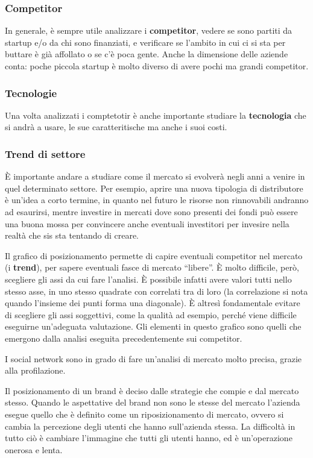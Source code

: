 \subsubsection{Competitor}
In generale, è sempre utile analizzare i \textbf{competitor}, vedere se sono
partiti da startup e/o da chi sono finanziati, e verificare se l'ambito in cui
ci si sta per buttare è già affollato o se c'è poca gente. Anche la dimensione
delle aziende conta: poche piccola startup è molto diverso di avere pochi ma
grandi competitor.

\subsubsection{Tecnologie}
Una volta analizzati i comptetotir è anche importante studiare la
\textbf{tecnologia} che si andrà a usare, le sue caratteritische ma anche i
suoi costi.

\subsubsection{Trend di settore}
È importante andare a studiare come il mercato si evolverà negli anni a venire
in quel determinato settore.
Per esempio, aprire una nuova tipologia di distributore è un'idea a corto
termine, in quanto nel futuro le risorse non rinnovabili andranno ad esaurirsi,
mentre investire in mercati dove sono presenti dei fondi può essere una buona
mossa per convincere anche eventuali investitori per invesire nella realtà che
sis sta tentando di creare.

Il grafico di posizionamento permette di capire eventuali competitor nel
mercato (i \textbf{trend}), per sapere eventuali fasce di mercato ``libere''.
È molto difficile, però, scegliere gli assi da cui fare l'analisi. È possibile
infatti avere valori tutti nello stesso asse, in uno stesso quadrate con
correlati tra di loro (la correlazione si nota quando l'insieme dei punti forma
una diagonale). È altresì fondamentale evitare di scegliere gli assi
soggettivi, come la qualità ad esempio, perché viene difficile eseguirne
un'adeguata valutazione. Gli elementi in questo grafico sono quelli che
emergono dalla analisi eseguita precedentemente sui competitor.


I social network sono in grado di fare un'analisi di mercato molto precisa,
grazie alla profilazione.

Il posizionamento di un brand è deciso dalle strategie che compie e dal mercato
stesso. Quando le aspettative del brand non sono le stesse del mercato
l'azienda esegue quello che è definito come un riposizionamento di mercato,
ovvero si cambia la percezione degli utenti che hanno sull'azienda stessa. La
difficoltà in tutto ciò è cambiare l'immagine che tutti gli utenti hanno, ed è
un'operazione onerosa e lenta.

